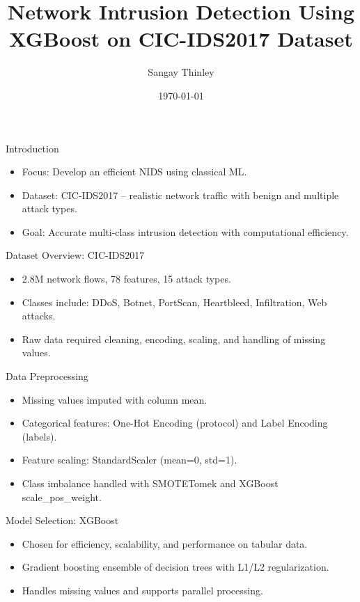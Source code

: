 \documentclass{beamer}
\title{Network Intrusion Detection Using XGBoost on CIC-IDS2017 Dataset}
\author{Sangay Thinley}
\institute{School of Built Environment, Engineering and Computing\\ Leeds Beckett University}
\date{\today}
\begin{document}
\frame{\titlepage}

\begin{frame}{Introduction}
\begin{itemize}
    \item Focus: Develop an efficient NIDS using classical ML.
    \item Dataset: CIC-IDS2017 – realistic network traffic with benign and multiple attack types.
    \item Goal: Accurate multi-class intrusion detection with computational efficiency.
\end{itemize}
\end{frame}

\begin{frame}{Dataset Overview: CIC-IDS2017}
\begin{itemize}
    \item 2.8M network flows, 78 features, 15 attack types.
    \item Classes include: DDoS, Botnet, PortScan, Heartbleed, Infiltration, Web attacks.
    \item Raw data required cleaning, encoding, scaling, and handling of missing values.
\end{itemize}
\end{frame}

\begin{frame}{Data Preprocessing}
\begin{itemize}
    \item Missing values imputed with column mean.
    \item Categorical features: One-Hot Encoding (protocol) and Label Encoding (labels).
    \item Feature scaling: StandardScaler (mean=0, std=1).
    \item Class imbalance handled with SMOTETomek and XGBoost scale\_pos\_weight.
\end{itemize}
\end{frame}

\begin{frame}{Model Selection: XGBoost}
\begin{itemize}
    \item Chosen for efficiency, scalability, and performance on tabular data.
    \item Gradient boosting ensemble of decision trees with L1/L2 regularization.
    \item Handles missing values and supports parallel processing.
\end{itemize}
\end{frame}
\end{document}
